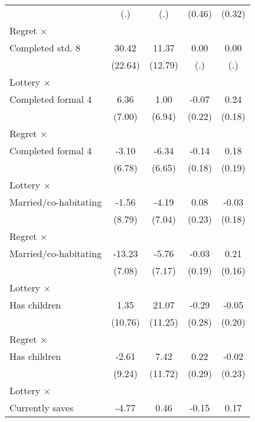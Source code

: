 \begin{table}[htbp]
\begin{tabular}{l*{4}{c}}
                &      (.)         &      (.)         &   (0.46)         &   (0.32)         \\
\addlinespace
Regret $\times$ \\ Completed std. 8&    30.42         &    11.37         &     0.00         &     0.00         \\
                &  (22.64)         &  (12.79)         &      (.)         &      (.)         \\
\addlinespace
Lottery $\times$ \\ Completed formal 4&     6.36         &     1.00         &    -0.07         &     0.24         \\
                &   (7.00)         &   (6.94)         &   (0.22)         &   (0.18)         \\
\addlinespace
Regret $\times$ \\ Completed formal 4&    -3.10         &    -6.34         &    -0.14         &     0.18         \\
                &   (6.78)         &   (6.65)         &   (0.18)         &   (0.19)         \\
\addlinespace
Lottery $\times$ \\ Married/co-habitating&    -1.56         &    -4.19         &     0.08         &    -0.03         \\
                &   (8.79)         &   (7.04)         &   (0.23)         &   (0.18)         \\
\addlinespace
Regret $\times$ \\ Married/co-habitating&   -13.23\sym{*}  &    -5.76         &    -0.03         &     0.21         \\
                &   (7.08)         &   (7.17)         &   (0.19)         &   (0.16)         \\
\addlinespace
Lottery $\times$ \\ Has children&     1.35         &    21.07\sym{*}  &    -0.29         &    -0.05         \\
                &  (10.76)         &  (11.25)         &   (0.28)         &   (0.20)         \\
\addlinespace
Regret $\times$ \\ Has children&    -2.61         &     7.42         &     0.22         &    -0.02         \\
                &   (9.24)         &  (11.72)         &   (0.29)         &   (0.23)         \\
\addlinespace
Lottery $\times$ \\ Currently saves&    -4.77         &     0.46         &    -0.15         &     0.17         \\

\end{tabular}
\end{table}
